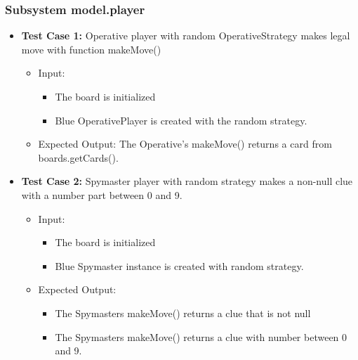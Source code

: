 \documentclass[12pt]{article}
\begin{document}
\subsubsection{Subsystem model.player}
\begin{itemize}
    \item \textbf{Test Case 1:} Operative player with random OperativeStrategy makes legal move with function makeMove() 
        \begin{itemize}
        \item Input:
            \begin{itemize}
                \item The board is initialized
                \item Blue OperativePlayer is created with the random strategy.
            \end{itemize}
        \item Expected Output: The Operative's makeMove() returns a card from boards.getCards().
    \end{itemize}
    
    
    \item \textbf{Test Case 2:} Spymaster player with random strategy makes a non-null clue with a number part between 0 and 9.
    \begin{itemize}
        \item Input:
        \begin{itemize}
            \item The board is initialized
            \item Blue Spymaster instance is created with random strategy.
        \end{itemize}
        \item Expected Output:
        \begin{itemize}
            \item The Spymasters makeMove() returns a clue that is not null
            \item The Spymasters makeMove() returns a clue with number between 0 and 9.
        \end{itemize}
    \end{itemize}
    
    
\end{itemize}
\end{document}
